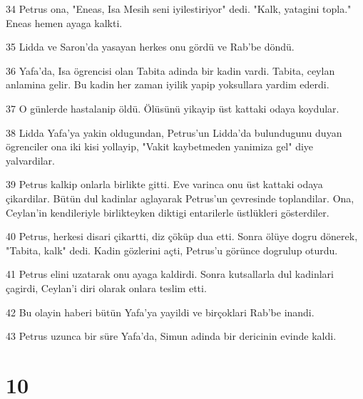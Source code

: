 \par 34 Petrus ona, "Eneas, Isa Mesih seni iyilestiriyor" dedi. "Kalk, yatagini topla." Eneas hemen ayaga kalkti.
\par 35 Lidda ve Saron'da yasayan herkes onu gördü ve Rab'be döndü.
\par 36 Yafa'da, Isa ögrencisi olan Tabita adinda bir kadin vardi. Tabita, ceylan anlamina gelir. Bu kadin her zaman iyilik yapip yoksullara yardim ederdi.
\par 37 O günlerde hastalanip öldü. Ölüsünü yikayip üst kattaki odaya koydular.
\par 38 Lidda Yafa'ya yakin oldugundan, Petrus'un Lidda'da bulundugunu duyan ögrenciler ona iki kisi yollayip, "Vakit kaybetmeden yanimiza gel" diye yalvardilar.
\par 39 Petrus kalkip onlarla birlikte gitti. Eve varinca onu üst kattaki odaya çikardilar. Bütün dul kadinlar aglayarak Petrus'un çevresinde toplandilar. Ona, Ceylan'in kendileriyle birlikteyken diktigi entarilerle üstlükleri gösterdiler.
\par 40 Petrus, herkesi disari çikartti, diz çöküp dua etti. Sonra ölüye dogru dönerek, "Tabita, kalk" dedi. Kadin gözlerini açti, Petrus'u görünce dogrulup oturdu.
\par 41 Petrus elini uzatarak onu ayaga kaldirdi. Sonra kutsallarla dul kadinlari çagirdi, Ceylan'i diri olarak onlara teslim etti.
\par 42 Bu olayin haberi bütün Yafa'ya yayildi ve birçoklari Rab'be inandi.
\par 43 Petrus uzunca bir süre Yafa'da, Simun adinda bir dericinin evinde kaldi.

\chapter{10}

